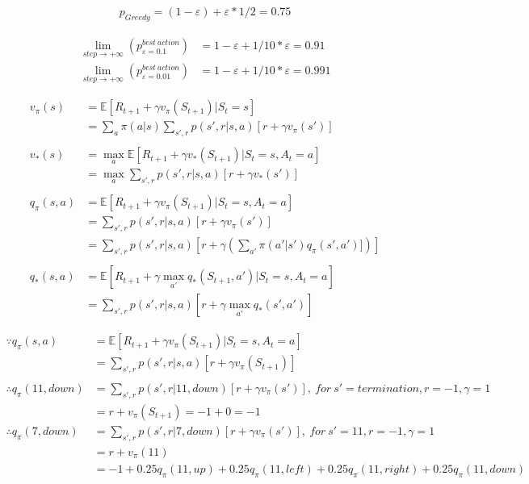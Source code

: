 \documentclass{article}
\begin{document}
\[
  \begin{aligned}
    p_{Greedy} = (1 - \varepsilon) + \varepsilon * 1/2 = 0.75
  \end{aligned}
\]

\[
  \begin{aligned}    
    \lim\limits_{step\to+\infty} (p_{\varepsilon=0.1}^{best \ action}) &= 1 - \varepsilon + 1/10 * \varepsilon = 0.91 \\
    \lim\limits_{step\to+\infty} (p_{\varepsilon=0.01}^{best \ action}) &= 1 - \varepsilon + 1/10 * \varepsilon = 0.991
  \end{aligned}
\]

\[
  \begin{aligned}
  v_{\pi}(s) &= \mathbb{E}[R_{t+1} + \gamma v_{\pi}(S_{t+1}) | S_{t}=s] \\
  &= \sum_{a}\pi(a|s) \sum_{s',r}p(s',r|s,a)[r + \gamma v_{\pi}(s')]\\
  \\
  v_{*}(s) &= \max_{a}\mathbb{E}[R_{t+1} + \gamma v_{*}(S_{t+1}) | S_{t}=s, A_{t}=a]\\
  &= \max_{a}\sum_{s',r}p(s',r|s,a)[r + \gamma v_{*}(s')]\\
  \\
  q_{\pi}(s,a) &= \mathbb{E}[R_{t+1} + \gamma v_{\pi}(S_{t+1}) | S_{t}=s, A_{t}=a]\\
  &= \sum_{s',r}p(s',r|s,a)[r + \gamma v_{\pi}(s')]\\
  &= \sum_{s',r}p(s',r|s,a)[r + \gamma (\sum_{a'}\pi(a'|s') q_{\pi}(s',a')])]\\
  \\
  q_{*}(s,a) &= \mathbb{E}[R_{t+1} + \gamma \max_{a'}q_{*}(S_{t+1}, a') | S_{t}=s, A_{t}=a]\\
  &= \sum_{s',r}p(s',r|s,a)[r + \gamma \max_{a'}q_{*}(s', a')]
  \end{aligned}
\]

\[
  \begin{aligned}
    \because q_{\pi}(s,a) &= \mathbb{E}[R_{t+1} + \gamma v_{\pi}(S_{t+1}) | S_{t}=s, A_{t}=a]\\
    &= \sum_{s',r}p(s',r|s,a)[r + \gamma v_{\pi}(S_{t+1})]\\
    \\
    \therefore q_{\pi}(11,down) &= \sum_{s',r}p(s',r|11,down)[r + \gamma v_{\pi}(s')], \  for \  s'=termination, r=-1, \gamma = 1\\
    &= r + v_{\pi}(S_{t+1}) = -1 + 0 = -1 \\
    \therefore q_{\pi}(7,down) &= \sum_{s',r}p(s',r|7,down)[r + \gamma v_{\pi}(s')], \  for \  s'=11, r=-1, \gamma = 1\\
    &= r + v_{\pi}(11) \\
    &= -1 + 0.25q_{\pi}(11,up) + 0.25q_{\pi}(11,left) + 0.25q_{\pi}(11,right) + 0.25q_{\pi}(11,down)\\
  \end{aligned}
\]
\end{document}
